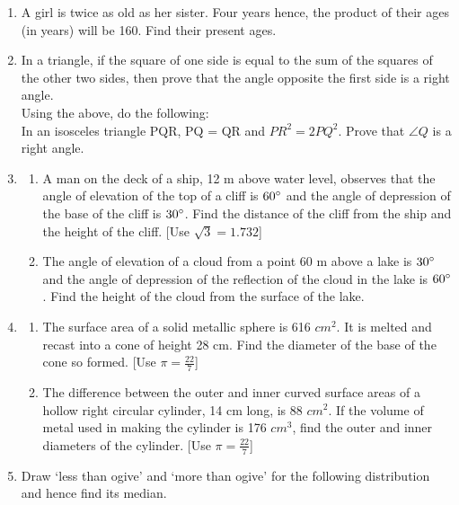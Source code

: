 \documentclass[journal,12pt,twocolumn]{IEEEtran}
\renewcommand\thesection{\arabic{section}}
\begin{document}
\begin{enumerate}[label=\thesection.\arabic*.,ref=\thesection.\theenumi]
\item A girl is twice as old as her sister. Four years hence, the product of their ages (in years) will be 160. Find their present ages. \\
\item In a triangle, if the square of one side is equal to the sum of the squares of the other two sides, then prove that the angle opposite the first side is a right angle. \\
Using the above, do the following: \\ In an isosceles triangle PQR, PQ = QR and $PR^2=2PQ^2$. Prove that $\angle Q$ is a right angle. \\
\item \begin{enumerate}
\item A man on the deck of a ship, 12 m above water level, observes that the angle of elevation of the top of a cliff is $60\degree$ and the angle of depression of the base of the cliff is $30\degree$. Find the distance of the cliff from the ship and the height of the cliff. [Use $\sqrt{3}= 1.732$] \\
\item The angle of elevation of a cloud from a point 60 m above a lake is $30\degree$ and the angle of depression of the reflection of the cloud in the lake is $60\degree$. Find the height of the cloud from the surface of the lake. \\
\end{enumerate}
\item \begin{enumerate}
\item The surface area of a solid metallic sphere is 616 $cm^2$. It is melted and recast into a cone of height 28 cm. Find the diameter of the base of the cone so formed.  [Use $\pi=\frac{22}{7}$] \\
\item The difference between the outer and inner curved surface areas of a hollow right circular cylinder, 14 cm long, is 88 $cm^2$. If the volume of metal used in making the cylinder is 176 $cm^3$, find the outer and inner diameters of the cylinder. [Use $\pi=\frac{22}{7}$] \\
\end{enumerate}
\item Draw ‘less than ogive’ and ‘more than ogive’ for the following distribution and hence find its median.
\begin{table}[ht]
 \centering
\end{table}
\end{enumerate}
\end{document}
